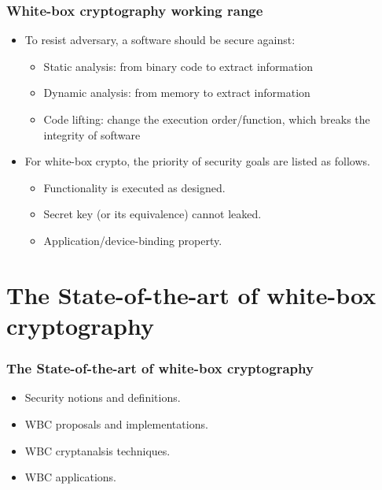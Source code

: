\documentclass[aspectratio=169,xcolor=dvipsnames]{beamer}
\begin{document}
\frame
{
\frametitle{White-box cryptography working range}
\begin{itemize}
\setlength{\itemsep}{12pt}
\item To resist adversary, a software should be secure against:
\begin{itemize}
\setlength{\itemsep}{12pt}
\item Static analysis: from binary code to extract information

\item Dynamic analysis: from memory to extract information

\item Code lifting: change the execution order/function, which breaks the integrity of software
\end{itemize}

\item For white-box crypto, the priority of security goals are listed as follows.
\begin{itemize}
\setlength{\itemsep}{12pt}
\item Functionality is executed as designed.

\item Secret key (or its equivalence) cannot leaked.

\item Application/device-binding property.
\end{itemize}

\end{itemize}

}


\section{The State-of-the-art of white-box cryptography}

\frame
{
\frametitle{The State-of-the-art of white-box cryptography}
\begin{itemize}
\setlength{\itemsep}{12pt}
\item Security notions and definitions.

\item WBC proposals and implementations.

\item WBC cryptanalsis techniques.

\item WBC applications.

\end{itemize}
}
\end{document}
